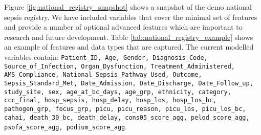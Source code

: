 Figure 
\ref{fig:national_registry_snapshot} shows a snapshot of the demo national sepsis registry.
We have included variables that cover the minimal set of features and provide a number of optional advanced features which are important to research and future development. 
Table 
\ref{tab:national_registry_example} 
shows an example of features and data types that are captured.
The current modelled variables contain:
\texttt{Patient\_ID, Age, Gender, Diagnosis\_Code, Source\_of\_Infection, Organ\_Dysfunction, Treatment\_Administered, AMS\_Compliance, National\_Sepsis\_Pathway\_Used, Outcome, Sepsis\_Standard\_Met, Date\_Admission, Date\_Discharge, Date\_Follow\_up, study\_site, sex, age\_at\_bc\_days, age\_grp, ethnicity, category, ccc\_final, hosp\_sepsis, hosp\_delay, hosp\_los, hosp\_los\_bc, pathogen\_grp, focus\_grp, picu, picu\_reason, picu\_los, picu\_los\_bc, cahai, death\_30\_bc, death\_delay, cons05\_score\_agg, pelod\_score\_agg, psofa\_score\_agg, podium\_score\_agg}.

